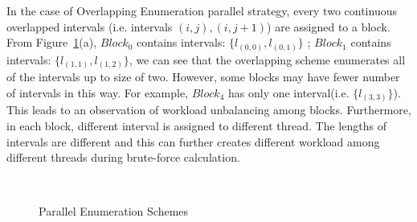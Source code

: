 \documentclass[AMA,LATO1COL]{WileyNJD-v2-bak}
\begin{document}
  In the case of Overlapping Enumeration parallel strategy, every two continuous overlapped intervals (i.e. intervals $(i,j),(i,j+1)$) are assigned to a block. From Figure~\ref{example1}(a), $Block_0$ contains intervals: $\{l_{(0,0)},l_{(0,1)}\}$ ; $Block_1$ contains intervals: $\{l_{(1,1)},l_{(1,2)}\}$, we can see that the overlapping scheme enumerates all of the intervals up to size of two. However, some blocks may have fewer number of intervals in this way. For example, $Block_4$ has only one interval(i.e. $\{l_{(3,3)}\}$). This leads to an observation of workload unbalancing among blocks. Furthermore, in each block, different interval is assigned to different thread. The lengths of intervals are different and this can further creates different workload among different threads during brute-force calculation.
\begin{figure}[t]
\centering
{}
~~\\
\caption{Parallel Enumeration Schemes\label{example1}}
\end{figure}
\end{document}
